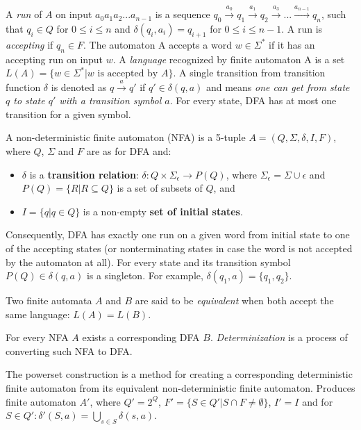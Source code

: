 A \emph{run} of $A$ on input $a_0a_1a_2...a_{n-1}$ is a sequence $q_0 \xrightarrow{a_0} q_1 \xrightarrow{a_1} q_2 \xrightarrow{a_3} ... \xrightarrow{a_{n-1}} q_n$, such that $q_i \in Q$ for $0 \leq i \leq n$ and $\delta(q_i, a_i) = q_{i+1}$ for $0 \leq i \leq n - 1$. A run is \emph{accepting} if $q_n \in F$. The automaton A accepts a word $w \in \Sigma^*$ if it has an accepting run on input $w$. A \emph{language} recognized by finite automaton A is a set $L(A) = \{w \in \Sigma^* | w \text{ is accepted by } A\}$. A single transition from transition function $\delta$ is denoted as $q \xrightarrow{a} q'$ if $q' \in \delta(q, a)$ and means \textit{one can get from state $q$ to state $q'$ with a transition symbol $a$}. For every state, DFA has at most one transition for a given symbol.

\begin{definition}
    A non-deterministic finite automaton (NFA) is a 5-tuple $A = (Q, \Sigma, \delta, I, F)$, where $Q$, $\Sigma$ and $F$ are as for DFA and:
    \begin{itemize}
        \item $\delta$ is a \textbf{transition relation}: $\delta: Q \times \Sigma_{\epsilon} \rightarrow{} P(Q)$, where $\Sigma_{\epsilon} = \Sigma \cup \epsilon$ and $P(Q) = \{R | R \subseteq Q\}$ is a set of subsets of $Q$, and
        \item $I = \{q | q \in Q\}$ is a non-empty \textbf{set of initial states}.
    \end{itemize}
\end{definition}

Consequently, DFA has exactly one run on a given word from initial state to one of the accepting states (or nonterminating states in case the word is not accepted by the automaton at all). For every state and its transition symbol $P(Q) \in \delta(q, a)$ is a singleton. For example, $\delta(q_1, a) = \{ q_1, q_2 \}$.

Two finite automata $A$ and $B$ are said to be \emph{equivalent} when both accept the same language: $L(A) = L(B)$.

For every NFA $A$ exists a corresponding DFA $B$. \emph{Determinization} is a process of converting such NFA to DFA.

\begin{definition}
    The powerset construction is a method for creating a corresponding deterministic finite automaton from its equivalent non-deterministic finite automaton. Produces finite automaton $A'$, where $Q' = 2^Q$, $F' = \{S \in Q' | S \cap F \neq \emptyset\}$, $I' = I$ and for $S \in Q': \delta'(S, a) = \bigcup_{s \in S} \delta(s, a)$.
\end{definition}


